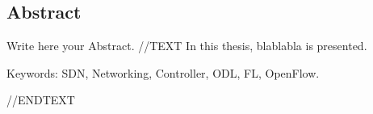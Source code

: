 \begingroup
\let\clearpage\relax
\let\cleardoublepage\relax
\let\cleardoublepage\relax

\begin{otherlanguage}{american}
\chapter*{Abstract}



Write here your Abstract.
//TEXT
In this thesis, blablabla is presented.

Keywords: SDN, Networking, Controller, ODL, FL, OpenFlow.

//ENDTEXT
\end{otherlanguage}

\vfill


\endgroup			

\vfill